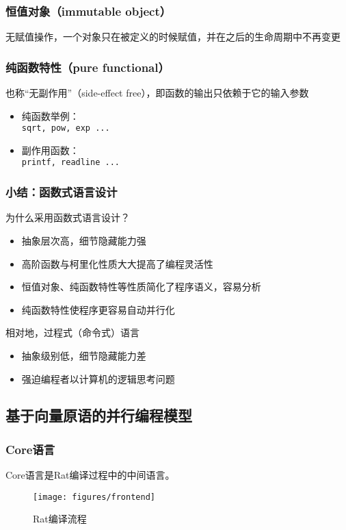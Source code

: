 \documentclass[]{beamer}
\begin{document}
\begin{frame}
  \frametitle{恒值对象（immutable object）}
  无赋值操作，一个对象只在被定义的时候赋值，并在之后的生命周期中不再变更
  
\end{frame}

\begin{frame}
  \frametitle{纯函数特性（pure functional）}
  也称“无副作用”（side-effect free），即函数的输出只依赖于它的输入参数
  \begin{itemize}
    \item 纯函数举例：\\\texttt{sqrt, pow, exp ...}
    \item 副作用函数：\\\texttt{printf, readline ...}
  \end{itemize}
\end{frame}

\begin{frame}
  \frametitle{小结：函数式语言设计}
  为什么采用函数式语言设计？
  \begin{itemize}
    \item 抽象层次高，细节隐藏能力强
    \item 高阶函数与柯里化性质大大提高了编程灵活性
    \item 恒值对象、纯函数特性等性质简化了程序语义，容易分析
    \item 纯函数特性使程序更容易自动并行化
  \end{itemize}
  \pause                        %
  相对地，过程式（命令式）语言
  \begin{itemize}
    \item 抽象级别低，细节隐藏能力差
    \item 强迫编程者以计算机的逻辑思考问题
  \end{itemize}
\end{frame}

\subsection{基于向量原语的并行编程模型}

\begin{frame}
  \frametitle{Core语言}
  Core语言是Rat编译过程中的中间语言。
  \begin{figure}
    \centering
    \texttt{[image: figures/frontend]}
    \caption{Rat编译流程}
  \end{figure}
\end{frame}
\end{document}
